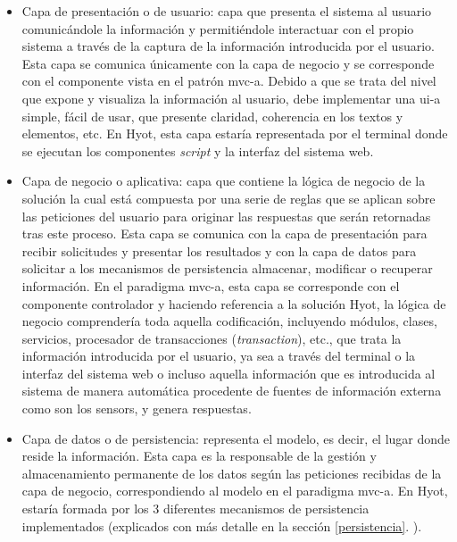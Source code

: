 \documentclass[12pt,a4paper, twoside]{report}
\begin{document}
	\begin{itemize}
		\item Capa de presentación o de usuario: capa que presenta el sistema al usuario comunicándole la información y permitiéndole interactuar con el propio sistema a través de la captura de la información introducida por el usuario. Esta capa se comunica únicamente con la capa de negocio y se corresponde con el componente vista en el patrón \gls{mvc-a}. Debido a que se trata del nivel que expone y visualiza la información al usuario, debe implementar una \gls{ui-a} simple, fácil de usar, que presente claridad, coherencia en los textos y elementos, etc. En Hyot, esta capa estaría representada por el terminal donde se ejecutan los componentes \textit{\gls{script}} y la interfaz del sistema web.
	
		\item Capa de negocio o aplicativa: capa que contiene la lógica de negocio de la solución la cual está compuesta por una serie de reglas que se aplican sobre las peticiones del usuario para originar las respuestas que serán retornadas tras este proceso. Esta capa se comunica con la capa de presentación para recibir solicitudes y presentar los resultados y con la capa de datos para solicitar a los mecanismos de persistencia almacenar, modificar o recuperar información. En el paradigma \gls{mvc-a}, esta capa se corresponde con el componente controlador y haciendo referencia a la solución Hyot, la lógica de negocio comprendería toda aquella codificación, incluyendo módulos, clases, servicios, procesador de transacciones (\textit{\gls{transaction}}), etc., que trata la información introducida por el usuario, ya sea a través del terminal o la interfaz del sistema web o incluso aquella información que es introducida al sistema de manera automática procedente de fuentes de información externa como son los \glspl{sensor}, y genera respuestas.
		
		\item Capa de datos o de persistencia: representa el modelo, es decir, el lugar donde reside la información. Esta capa es la responsable de la gestión y almacenamiento permanente de los datos según las peticiones recibidas de la capa de negocio, correspondiendo al modelo en el paradigma \gls{mvc-a}. En Hyot, estaría formada por los 3 diferentes mecanismos de persistencia implementados (explicados con más detalle en la sección \ref{persistencia}. ).		 
	\end{itemize} 	
	
\end{document}
